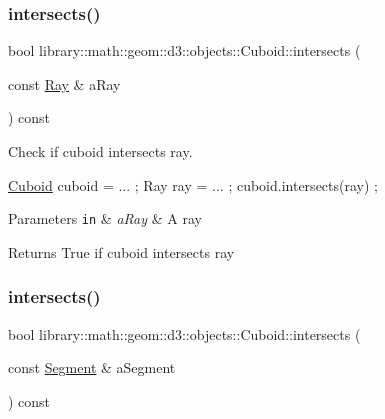 \subsubsection{\texorpdfstring{intersects()}{intersects()}\hspace{0.1cm}{\footnotesize\ttfamily [4/9]}}
{\footnotesize\ttfamily bool library\+::math\+::geom\+::d3\+::objects\+::\+Cuboid\+::intersects (\begin{DoxyParamCaption}\item[{const \hyperlink{classlibrary_1_1math_1_1geom_1_1d3_1_1objects_1_1_ray}{Ray} \&}]{a\+Ray }\end{DoxyParamCaption}) const}



Check if cuboid intersects ray. 


\begin{DoxyCode}
\hyperlink{classlibrary_1_1math_1_1geom_1_1d3_1_1objects_1_1_cuboid_ac42299f962fab284a76a46d4ea4e6fa2}{Cuboid} cuboid = ... ;
Ray ray = ... ;
cuboid.intersects(ray) ;
\end{DoxyCode}



\begin{DoxyParams}[1]{Parameters}
\mbox{\tt in}  & {\em a\+Ray} & A ray \\
\hline
\end{DoxyParams}
\begin{DoxyReturn}{Returns}
True if cuboid intersects ray 
\end{DoxyReturn}
\mbox{\label{classlibrary_1_1math_1_1geom_1_1d3_1_1objects_1_1_cuboid_af171e9e8e392905f42e004ab1c8d5972}} 
\subsubsection{\texorpdfstring{intersects()}{intersects()}\hspace{0.1cm}{\footnotesize\ttfamily [5/9]}}
{\footnotesize\ttfamily bool library\+::math\+::geom\+::d3\+::objects\+::\+Cuboid\+::intersects (\begin{DoxyParamCaption}\item[{const \hyperlink{classlibrary_1_1math_1_1geom_1_1d3_1_1objects_1_1_segment}{Segment} \&}]{a\+Segment }\end{DoxyParamCaption}) const}



